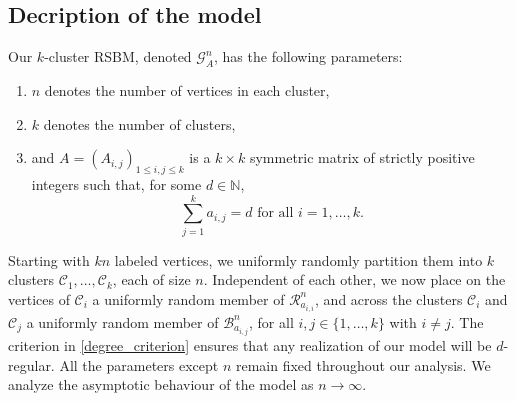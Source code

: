 \documentclass[11pt,reqno]{amsart}
\theoremstyle{definition}
\theoremstyle{remark}
\theoremstyle{conjecture}
\begin{document}

\subsection{Decription of the model}\label{model_defn} Our $k$-cluster RSBM, denoted $\mathcal{G}^{n}_{A}$, has the following parameters: 
\begin{enumerate}
\item $n$ denotes the number of vertices in each cluster, 
\item $k$ denotes the number of clusters, 
\item and $A = \left(A_{i,j}\right)_{1 \leqslant i, j \leqslant k}$ is a $k \times k$ symmetric matrix of strictly positive integers such that, for some $d \in \mathbb{N}$,
\begin{equation}\label{degree_criterion}
\sum_{j=1}^{k} a_{i,j} = d \text{ for all } i = 1, \ldots, k.
\end{equation} 
\end{enumerate}
Starting with $k n$ labeled vertices, we uniformly randomly partition them into $k$ clusters $\mathcal{C}_{1}, \ldots, \mathcal{C}_{k}$, each of size $n$. Independent of each other, we now place on the vertices of $\mathcal{C}_{i}$ a uniformly random member of $\mathcal{R}^{n}_{a_{i,i}}$, and across the clusters $\mathcal{C}_{i}$ and $\mathcal{C}_{j}$ a uniformly random member of $\mathcal{B}^{n}_{a_{i,j}}$, for all $i, j \in \{1, \ldots, k\}$ with $i \neq j$. The criterion in \eqref{degree_criterion} ensures that any realization of our model will be $d$-regular. All the parameters except $n$ remain fixed throughout our analysis. We analyze the asymptotic behaviour of the model as $n \rightarrow \infty$.
\end{document}
